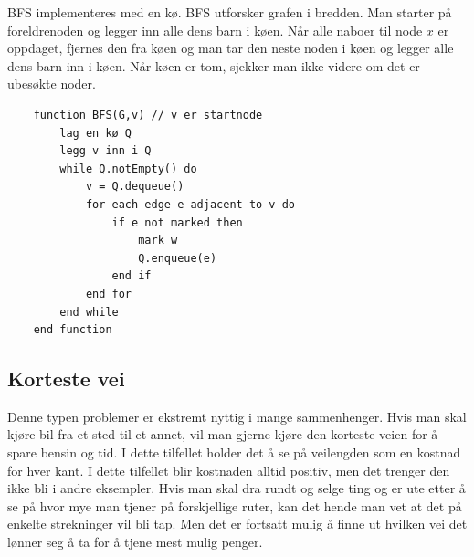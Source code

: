 \noindent BFS implementeres med en kø. BFS utforsker grafen i bredden. Man starter på foreldrenoden og legger inn alle dens barn i køen. Når alle naboer til node $x$ er oppdaget, fjernes den fra køen og man tar den neste noden i køen og legger alle dens barn inn i køen. Når køen er tom, sjekker man ikke videre om det er ubesøkte noder.

\begin{lstlisting}
    function BFS(G,v) // v er startnode
	    lag en kø Q
    	legg v inn i Q
    	while Q.notEmpty() do
    		v = Q.dequeue()
    		for each edge e adjacent to v do
    			if e not marked then
    				mark w
    				Q.enqueue(e)
    			end if
    		end for
    	end while
    end function

\end{lstlisting}

\subsection{Korteste vei}
Denne typen problemer er ekstremt nyttig i mange sammenhenger. Hvis man skal kjøre bil fra et sted til et annet, vil man gjerne kjøre den korteste veien for å spare bensin og tid. I dette tilfellet holder det å se på veilengden som en kostnad for hver kant. I dette tilfellet blir kostnaden alltid positiv, men det trenger den ikke bli i andre eksempler. Hvis man skal dra rundt og selge ting og er ute etter å se på hvor mye man tjener på forskjellige ruter, kan det hende man vet at det på enkelte strekninger vil bli tap. Men det er fortsatt mulig å finne ut hvilken vei det lønner seg å ta for å tjene mest mulig penger.

